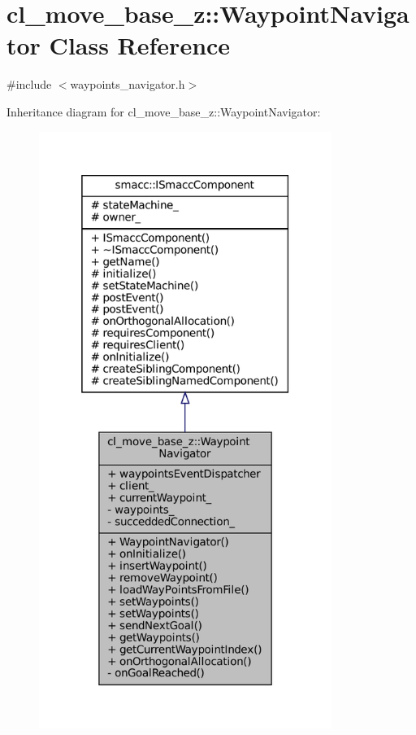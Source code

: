 \hypertarget{classcl__move__base__z_1_1WaypointNavigator}{}\section{cl\+\_\+move\+\_\+base\+\_\+z\+:\+:Waypoint\+Navigator Class Reference}
\label{classcl__move__base__z_1_1WaypointNavigator}


{\ttfamily \#include $<$waypoints\+\_\+navigator.\+h$>$}



Inheritance diagram for cl\+\_\+move\+\_\+base\+\_\+z\+:\+:Waypoint\+Navigator\+:
\nopagebreak
\begin{figure}[H]
\begin{center}
\leavevmode
\includegraphics[height=550pt]{classcl__move__base__z_1_1WaypointNavigator__inherit__graph}
\end{center}
\end{figure}


